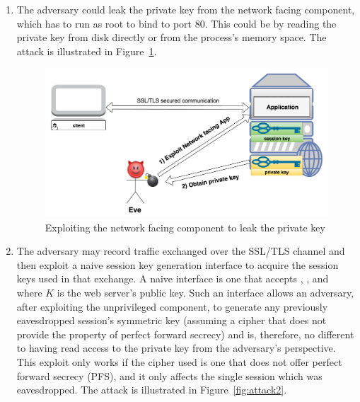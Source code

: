 \documentclass[../main.tex]{subfiles}
\begin{document}
\begin{enumerate}     
	\item The adversary could leak the private key from
	the network facing component, which has to run as root to bind to port 80.
	This could be by reading the private key from disk directly or from the
	process's memory space. The attack is illustrated in
	Figure~\ref{fig:attack1}.

	\begin{figure}[H]
		\centering
		\includegraphics[scale=0.15]{images/attack1.png}
		\caption{Exploiting the network facing component to leak the
		private key}
		\label{fig:attack1} 
	\end{figure}

	\item The adversary may record traffic exchanged over the SSL/TLS channel
	and then exploit a naive session key generation interface to acquire the 
	session keys used in that exchange. A naive interface is one that accepts
	\crandom, \srandom, and \premaster~ where $K$ is the web server's public key.
	Such an interface allows an adversary, after exploiting the unprivileged
	component, to generate any previously eavesdropped session's symmetric key 
	(assuming a cipher that does not provide the property of perfect forward
	secrecy) and is, therefore, no different to having read access to the private
	key from the adversary's perspective. This exploit only works if the cipher
	used is one that does not offer perfect forward secrecy (PFS), and it
	only affects the single session which was eavesdropped. The attack is
	illustrated in Figure~\ref{fig:attack2}.


\end{enumerate}
\end{document}
